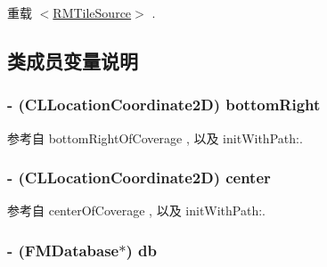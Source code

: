 重载 \hyperlink{protocol_r_m_tile_source-p_a1838a34e9341efe7c76252e131824261}{$<$\-R\-M\-Tile\-Source$>$} .



\subsection{类成员变量说明}
\hypertarget{interface_r_m_d_b_map_source_ab2a40bc56609cd9b73603c54e8f6e0c5}{
\subsubsection[{bottom\-Right}]{\setlength{\rightskip}{0pt plus 5cm}-\/ (C\-L\-Location\-Coordinate2\-D) bottom\-Right\hspace{0.3cm}{\ttfamily [protected]}}}\label{interface_r_m_d_b_map_source_ab2a40bc56609cd9b73603c54e8f6e0c5}


参考自 bottom\-Right\-Of\-Coverage , 以及 init\-With\-Path\-:.

\hypertarget{interface_r_m_d_b_map_source_a507ddd273bc2a994d9d4fe5e4482baf5}{
\subsubsection[{center}]{\setlength{\rightskip}{0pt plus 5cm}-\/ (C\-L\-Location\-Coordinate2\-D) center\hspace{0.3cm}{\ttfamily [protected]}}}\label{interface_r_m_d_b_map_source_a507ddd273bc2a994d9d4fe5e4482baf5}


参考自 center\-Of\-Coverage , 以及 init\-With\-Path\-:.

\hypertarget{interface_r_m_d_b_map_source_a7a3b8f8155ec28765c51bc3543e5d630}{
\subsubsection[{db}]{\setlength{\rightskip}{0pt plus 5cm}-\/ (F\-M\-Database$\ast$) db\hspace{0.3cm}{\ttfamily [protected]}}}\label{interface_r_m_d_b_map_source_a7a3b8f8155ec28765c51bc3543e5d630}



